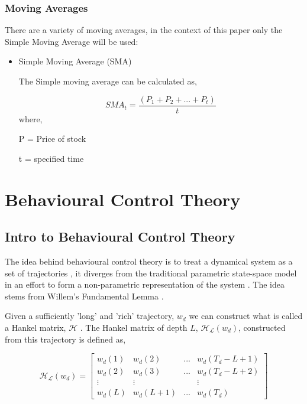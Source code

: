 \subsubsection{Moving Averages}

There are a variety of moving averages, in the context of this paper only the Simple Moving Average will be used:

\begin{itemize}
    \item Simple Moving Average (SMA) \cite{SMA}
    
    The Simple moving average can be calculated as,
    
    \begin{equation}
    \label{eqn: SMA}
        SMA_t = \frac{(P_1 + P_2 + ...+ P_t)}{t}
    \end{equation}
    where, 
    
    P = Price of stock 
    
    t = specified time 
    
    
\end{itemize}

\clearpage

\section{Behavioural Control Theory}

\subsection{Intro to Behavioural Control Theory}
\label{back: behavioural}
The idea behind behavioural control theory is to treat a dynamical system as a set of trajectories \cite{markovsky}, it diverges from the traditional parametric state-space model in an effort to form a non-parametric representation of the system \cite{markovsky}. The idea stems from Willem's Fundamental Lemma \cite{will}. 

\noindent Given a sufficiently 'long' and 'rich' trajectory, $w_d$ we can construct what is called a Hankel matrix, $\mathcal{H}$ \cite{markovsky2}. The Hankel matrix of depth $L$, $\mathcal{H_L}(w_d)$, constructed from this trajectory is defined as,

\begin{equation}
    \label{eqn: hank}
    \mathcal{H_L}(w_d) = 
    \begin{bmatrix} 
        w_{d}(1) & w_{d}(2) & ... & w_{d}(T_{d}-L+1) \\
        w_{d}(2) & w_{d}(3) & ... & w_{d}(T_{d}-L+2) \\
        \vdots & \vdots & &\vdots \\
        w_{d}(L) & w_{d}(L+1) & ... & w_{d}(T_{d})
    \end{bmatrix}
\end{equation}

